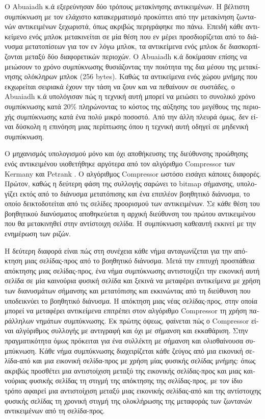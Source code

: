 \begin{greek}
Ο Abuaiadh κ.ά εξερεύνησαν δύο τρόπους μετακίνησης αντικειμένων.
Η βέλτιστη συμπύκνωση με τον ελάχιστο κατακερματισμό προκύπτει
από την μετακίνηση ζωντανών αντικειμένων ξεχωριστά, όπως ακριβώς
περιγράφηκε πιο πάνω. Επειδή κάθε αντικείμενο ενός μπλοκ μετακινείται
σε μία θέση που εν μέρει προσδιορίζεται από το διάνυσμα μετατοπίσεων
για τον εν λόγω μπλοκ, τα αντικείμενα ενός μπλοκ δε διασκορπίζονται
μεταξύ δύο διαφορετικών περιοχών. Ο Abuaiadh κ.ά δοκίμασαν επίσης
να μειώσουν το χρόνο συμπύκνωσης θυσιάζοντας την ποιότητα της δια
μέσου της μετακίνησης ολόκληρων μπλοκ (256 bytes). Καθώς τα αντικείμενα
ενός χώρου μνήμης που εκχωρείται σειριακά έχουν την τάση να ζουν
και να πεθαίνουν σε συστάδες, ο Abuaiadh κ.ά υπολόγισαν πώς
η τεχνική αυτή μπορεί να μειώσει το συνολικό χρόνο συμπύκνωσης
κατά 20\% πληρώνοντας το κόστος της αύξησης του μεγέθους της
περιοχής συμπύκνωσης κατά ένα πολύ μικρό ποσοστό. Από την άλλη
πλευρά όμως, δεν είναι δύσκολη η επινόηση μιας περίπτωσης όπου
η τεχνική αυτή οδηγεί σε μηδενική συμπύκνωση.

Ο μηχανισμός υπολογισμού μόνο και όχι αποθήκευσης της διεύθυνσης
προώθησης ενός αντικειμένου υιοθετήθηκε αργότερα από τον αλγόριθμο
Compressor των Kermany και Petrank \cite{DBLP:conf/pldi/KermanyP06}.
Ο αλγόριθμος Compressor ωστόσο εισάγει κάποιες διαφορές. Πρώτον,
καθώς η δεύτερη φάση της συλλογής σαρώνει το bitmap σήμανσης,
υπολογίζει εκτός από το διάνυσμα μετατόπισης και ένα επιπλέον
βοηθητικό διάνυσμα, το οποίο δεικτοδοτείται από τις σελίδες προορισμού
των αντικειμένων. Σε κάθε θέση του βοηθητικού διανύσματος αποθηκεύεται
η αρχική διεύθυνση του πρώτου αντικειμένου που θα μετακινηθεί
στην αντίστοιχη σελίδα. Η συμπύκνωση καθεαυτή εκκινεί με την
ενημέρωση των ριζών.

Η δεύτερη διαφορά είναι πώς στη συνέχεια κάθε νήμα ανταγωνίζεται
για την απόκτηση μιας σελίδας-προς από το βοηθητικό διάνυσμα.
Μετά την επιτυχή προσπάθεια απόκτησης μιας σελίδας-προς, ένα
νήμα συμπύκνωσης αντιστοιχίζει την εικονική αυτή σελίδα σε μία
καινούρια φυσική σελίδα και ξεκινά να μεταφέρει αντικείμενα
με χρήση των διανυσμάτων σήμανσης και μετατόπισης και εκκινώντας
από τη διεύθυνση που υποδεικνύει το βοηθητικό διάνυσμα. Η απόκτηση
μιας νέας σελίδας-προς, στην οποία μπορεί να μεταφέρει αντικείμενα
επιτρέπει στον αλγόριθμο Compressor τη χρήση παράλληλων νημάτων
συμπύκνωσης. Εκ πρώτης όψεως, φαίνεται πώς ο Compressor είναι
αλγόριθμος συλλογής με αντιγραφή και όχι με σήμανση και εκκαθάριση.
Στην πραγματικότητα όμως πρόκειται για ένα συλλέκτη με σήμανση
και ολισθαίνουσα συμπύκνωση. Κάθε νήμα συμπύκνωσης διαχειρίζεται
κάθε ζεύγος από μια εικονική σελίδα-από και μια εικονική σελίδα-προς
με χρήση μίας φυσικής σελίδας μνήμης: όπως ακριβώς προσθέτει
μια αντιστοίχιση μεταξύ της εικονικής σελίδας-προς και μιας
καινούριας φυσικής σελίδας τη στιγμή της απόκτησης της σελίδας-προς,
με τον ίδιο τρόπο αφαιρεί μια αντιστοίχιση μεταξύ μιας εικονικής
σελίδας-από και της αντίστοιχης φυσικής σελίδας τη χρονική στιγμή
της ολοκλήρωσης της μεταφοράς των ζωντανών αντικειμένων από τη
σελίδα-προς.
 

\end{greek}
